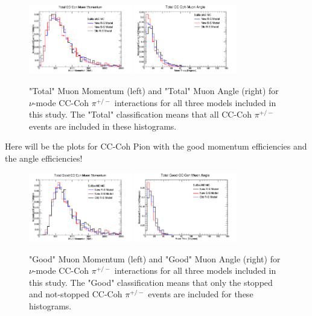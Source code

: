 \documentclass[11pt]{article}
\begin{document}
\begin{figure}[H]
\centering
\includegraphics[width=0.4\textwidth]{CCCohPlots/NMCCCohTotalMomentum.png}
\includegraphics[width=0.4\textwidth]{CCCohPlots/NMCCCohTotalAngle.png}
\caption{"Total" Muon Momentum (left) and "Total" Muon Angle (right) for $\nu$-mode CC-Coh $\pi^{+/-}$ interactions for all three models included in this study. The "Total" classification means that all CC-Coh $\pi^{+/-}$ events are included in these histograms.}
\end{figure}\label{fig:NuModeCCCohTotalMomAndAng}

Here will be the plots for CC-Coh Pion with the good momentum efficiencies and the angle efficiencies!

\begin{figure}[H]
\centering
\includegraphics[width=0.4\textwidth]{CCCohPlots/NMCCCohGoodMomentum.png}
\includegraphics[width=0.4\textwidth]{CCCohPlots/NMCCCohGoodAngle.png}
\caption{"Good" Muon Momentum (left) and "Good" Muon Angle (right) for $\nu$-mode CC-Coh $\pi^{+/-}$ interactions for all three models included in this study. The "Good" classification means that only the stopped and not-stopped CC-Coh $\pi^{+/-}$ events are included for these histograms.}
\end{figure}\label{fig:NuModeCCCohGoodMomAndAng}
\end{document}
